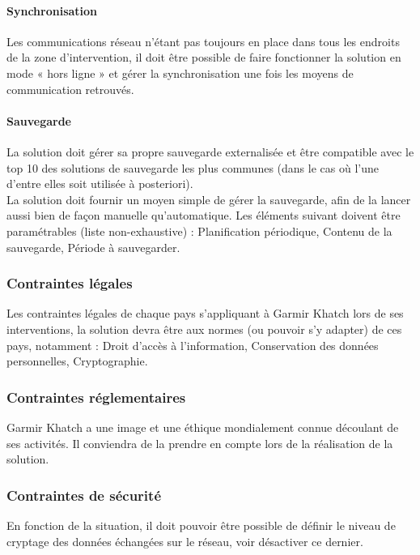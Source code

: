 \documentclass[11pt,fleqn]{book} %
\begin{document}
\paragraph{Synchronisation}
Les communications réseau n'étant pas toujours en place dans tous les endroits de la zone d'intervention, il doit être possible de faire fonctionner la solution en mode « hors ligne » et gérer la synchronisation une fois les moyens de communication retrouvés.

\paragraph{Sauvegarde}
La solution doit gérer sa propre sauvegarde externalisée et être compatible avec le top 10 des solutions de sauvegarde les plus communes (dans le cas où l'une d'entre elles soit utilisée à posteriori).
\\
La solution doit fournir un moyen simple de gérer la sauvegarde, afin de la lancer aussi bien de façon manuelle qu'automatique. Les éléments suivant doivent être paramétrables (liste non-exhaustive) :
Planification périodique,
Contenu de la sauvegarde,
Période à sauvegarder.

\subsubsection{Contraintes légales}
Les contraintes légales de chaque pays s'appliquant à Garmir Khatch lors de ses interventions, la solution devra être aux normes (ou pouvoir s'y adapter) de ces pays, notamment :
Droit d'accès à l'information,
Conservation des données personnelles,
Cryptographie.

\subsubsection{Contraintes réglementaires}
Garmir Khatch a une image et une éthique mondialement connue découlant de ses activités. Il conviendra de la prendre en compte lors de la réalisation de la solution.

\subsubsection{Contraintes de sécurité}
En fonction de la situation, il doit pouvoir être possible de définir le niveau de cryptage des données échangées sur le réseau, voir désactiver ce dernier.
\end{document}
